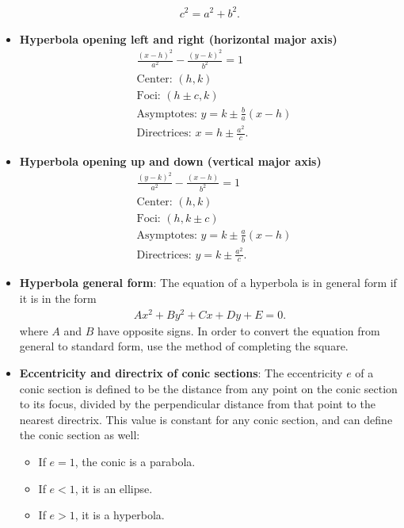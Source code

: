 \documentclass{report}
\begin{document}
\begin{itemize}
\begin{align*}
            c^{2} = a^{2} + b^{2}
        .\end{align*}
    \item \textbf{Hyperbola opening left and right (horizontal major axis)}
        \begin{align*}
            &\frac{(x-h)^{2}}{a^{2}} - \frac{(y-k)^{2}}{b^{2}} = 1 \\
            &\text{Center: } (h,k) \\
            &\text{Foci: } (h\pm c, k) \\
            &\text{Asymptotes: } y= k\pm \frac{b}{a}(x-h) \\
            &\text{Directrices: } x=h\pm \frac{a^{2}}{c}
        .\end{align*}
    \item \textbf{Hyperbola opening up and down (vertical major axis)}
        \begin{align*}
            &\frac{(y-k)^{2}}{a^{2}} - \frac{(x-h)}{b^{2}} = 1 \\
            &\text{Center: } (h,k) \\
            &\text{Foci: } (h, k\pm c) \\
            &\text{Asymptotes: } y= k\pm \frac{a}{b}(x-h) \\
            &\text{Directrices: } y=k\pm \frac{a^{2}}{c}
        .\end{align*}
    \item \textbf{Hyperbola general form}: The equation of a hyperbola is in general form if it is in the form  
        \begin{align*}
            Ax^{2} + By^{2} + Cx + Dy + E = 0
        .\end{align*}
        \bigbreak \noindent 
      where $A$ and $B$ have opposite signs. In order to convert the equation from general to standard form, use the method of completing the square.
    \item \textbf{Eccentricity and directrix of conic sections}:
    The eccentricity $e$ of a conic section is defined to be the distance from any point on the conic section to its focus, divided by the perpendicular distance from that point to the nearest directrix. This value is constant for any conic section, and can define the conic section as well:
    \begin{itemize}
        \item If $e=1$, the conic is a parabola.
        \item If $e<1$, it is an ellipse.
        \item If $e>1$, it is a hyperbola.

\end{itemize}
\end{itemize}
\end{document}

